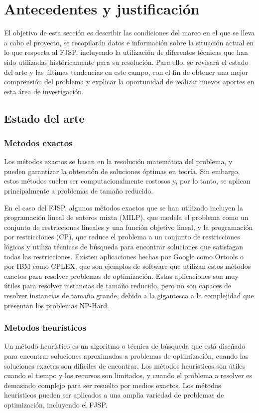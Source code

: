 \section{Antecedentes y justificación}
El objetivo de esta sección es describir las condiciones del marco en el que se lleva a cabo 
el proyecto, se recopilarán datos e información sobre la situación actual en lo que respecta al FJSP, 
incluyendo la utilización de diferentes técnicas que han sido utilizadas históricamente para su resolución. 
Para ello, se revisará el estado del arte y las últimas tendencias en este campo, con el fin de obtener una 
mejor comprensión del problema y explicar la oportunidad de realizar nuevos aportes en esta área de investigación.


\subsection{Estado del arte}
\subsubsection{Metodos exactos}
Los métodos exactos se basan en la resolución matemática del problema, y pueden garantizar la 
obtención de soluciones óptimas en teoría. Sin embargo, estos métodos suelen ser computacionalmente 
costosos y, por lo tanto, se aplican principalmente a problemas de tamaño reducido.\medskip

En el caso del FJSP, algunos métodos exactos que se han utilizado incluyen la programación 
lineal de enteros mixta (MILP)\cite{milp}, que modela el problema como un conjunto de restricciones lineales y 
una función objetivo lineal, y la programación por restricciones (CP)\cite{wikiCP}, que reduce el problema a
un conjunto de restricciones lógicas y utiliza técnicas de búsqueda para encontrar soluciones que satisfagan 
todas las restricciones. Existen aplicaciones hechas por Google como Ortools\cite{ortools}
o por IBM como CPLEX\cite{cplex}, que son ejemplos de software que utilizan estos métodos exactos para resolver
problemas de optimización. Estas aplicaciones son muy útiles para resolver instancias de tamaño reducido,
pero no son capaces de resolver instancias de tamaño grande, debido a la gigantesca a la complejidad que 
presentan los problemas NP-Hard.


\subsubsection{Metodos heurísticos}
Un método heurístico\cite{Novoseltseva_2021} es un algoritmo o técnica de búsqueda que está diseñado para encontrar 
soluciones aproximadas a problemas de optimización, cuando las soluciones exactas son difíciles 
de encontrar. Los métodos heurísticos son útiles cuando el tiempo y los recursos son limitados, 
y cuando el problema a resolver es demasiado complejo para ser resuelto por medios exactos. 
Los métodos heurísticos pueden ser aplicados a una amplia variedad de problemas de optimización, 
incluyendo el FJSP.\medskip

